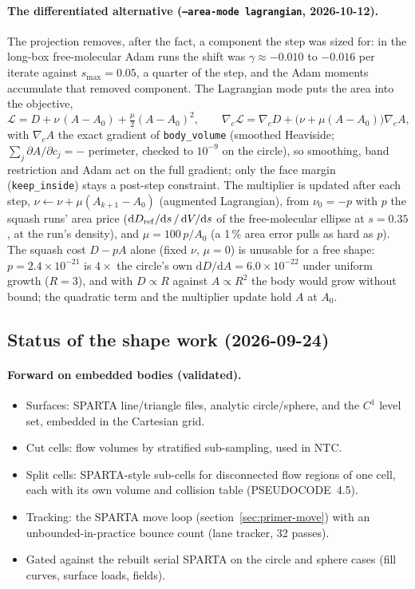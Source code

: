 \documentclass[11pt,a4paper]{article}
\numberwithin{equation}{section}
\newcommand{\code}[1]{\texttt{#1}}
\begin{document}
\paragraph{The differentiated alternative (\code{--area-mode lagrangian}, 2026-10-12).}
The projection removes, after the fact, a component the step was sized for: in the
long-box free-molecular Adam runs the shift was $\gamma\approx-0.010$ to $-0.016$ per
iterate against $s_{\max} = 0.05$, a quarter of the step, and the Adam moments accumulate
that removed component.  The Lagrangian mode puts the area into the objective,
\[
\mathcal L = D + \nu\,(A - A_0) + \tfrac{\mu}{2}(A - A_0)^2,\qquad
\nabla_c\mathcal L = \nabla_c D + \big(\nu + \mu(A - A_0)\big)\nabla_c A,
\]
with $\nabla_c A$ the exact gradient of \code{body\_volume} (smoothed Heaviside;
$\sum_j\partial A/\partial c_j = -$ perimeter, checked to $10^{-9}$ on the circle), so
smoothing, band restriction and Adam act on the full gradient; only the face margin
(\code{keep\_inside}) stays a post-step constraint.  The multiplier is updated after each
step, $\nu \leftarrow \nu + \mu(A_{k+1} - A_0)$ (augmented Lagrangian), from
$\nu_0 = -p$ with $p$ the squash runs' area price ($\mathrm dD_{\rm ref}/\mathrm ds\,/\,\mathrm dV/\mathrm ds$
of the free-molecular ellipse at $s = 0.35$, at the run's density), and
$\mu = 100\,p/A_0$ (a 1\,\% area error pulls as hard as $p$).  The squash cost
$D - pA$ alone (fixed $\nu$, $\mu = 0$) is unusable for a free shape: $p = 2.4\times10^{-21}$
is $4\times$ the circle's own $\mathrm dD/\mathrm dA = 6.0\times10^{-22}$ under uniform growth
($R = 3$), and with $D\propto R$ against $A\propto R^2$ the body would grow without bound;
the quadratic term and the multiplier update hold $A$ at $A_0$.

\subsection{Status of the shape work (2026-09-24)}
\label{sec:status}

\paragraph{Forward on embedded bodies (validated).}
\begin{itemize}
\item Surfaces: SPARTA line/triangle files, analytic circle/sphere, and the $C^1$ level
  set, embedded in the Cartesian grid.
\item Cut cells: flow volumes by stratified sub-sampling, used in NTC.
\item Split cells: SPARTA-style sub-cells for disconnected flow regions of one cell,
  each with its own volume and collision table (PSEUDOCODE~4.5).
\item Tracking: the SPARTA move loop (section~\ref{sec:primer-move}) with an
  unbounded-in-practice bounce count (lane tracker, 32 passes).
\item Gated against the rebuilt serial SPARTA on the circle and sphere cases
  (fill curves, surface loads, fields).
\end{itemize}
\end{document}
